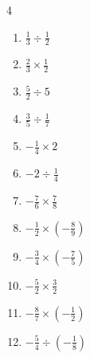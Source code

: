 \begin{multicols}{4}
\begin{enumerate}
  \item $\displaystyle \frac{1}{3}\div{}\frac{1}{2}$


  \item $\displaystyle \frac{2}{3}\times{}\frac{1}{2}$


\columnbreak %

  \item $\displaystyle \frac{5}{2}\div{}5$


  \item $\displaystyle \frac{3}{5}\div{}\frac{1}{7}$


  \item $\displaystyle -\frac{1}{4}\times{}2$


  \item $\displaystyle -2\div{}\frac{1}{4}$

        \phantom{$\displaystyle =-8$}

  \item $\displaystyle -\frac{7}{6}\times{}\frac{7}{8}$


  \item $\displaystyle -\frac{1}{2}\times{}\left(-\frac{8}{9}\right)$


  \item $\displaystyle -\frac{3}{4}\times{}\left(-\frac{7}{5}\right)$


  \item $\displaystyle -\frac{5}{2}\times{}\frac{3}{2}$


  \item $\displaystyle -\frac{8}{7}\times{}\left(-\frac{1}{2}\right)$


  \item $\displaystyle -\frac{5}{4}\div{}\left(-\frac{1}{8}\right)$


\end{enumerate}
\end{multicols}
